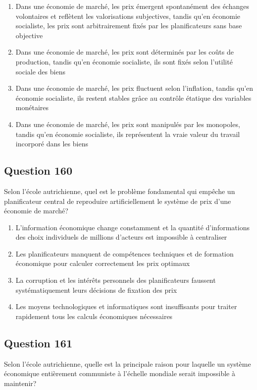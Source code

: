 \documentclass[12pt,a4paper]{article}
\begin{document}
\begin{enumerate}[label=\Alph*., leftmargin=*]
\item Dans une économie de marché, les prix émergent spontanément des échanges volontaires et reflètent les valorisations subjectives, tandis qu'en économie socialiste, les prix sont arbitrairement fixés par les planificateurs sans base objective
\item Dans une économie de marché, les prix sont déterminés par les coûts de production, tandis qu'en économie socialiste, ils sont fixés selon l'utilité sociale des biens
\item Dans une économie de marché, les prix fluctuent selon l'inflation, tandis qu'en économie socialiste, ils restent stables grâce au contrôle étatique des variables monétaires
\item Dans une économie de marché, les prix sont manipulés par les monopoles, tandis qu'en économie socialiste, ils représentent la vraie valeur du travail incorporé dans les biens
\end{enumerate}

\bigskip


\subsection*{Question 160}
Selon l'école autrichienne, quel est le problème fondamental qui empêche un planificateur central de reproduire artificiellement le système de prix d'une économie de marché?

\begin{enumerate}[label=\Alph*., leftmargin=*]
\item L'information économique change constamment et la quantité d'informations des choix individuels de millions d'acteurs est impossible à centraliser
\item Les planificateurs manquent de compétences techniques et de formation économique pour calculer correctement les prix optimaux
\item La corruption et les intérêts personnels des planificateurs faussent systématiquement leurs décisions de fixation des prix
\item Les moyens technologiques et informatiques sont insuffisants pour traiter rapidement tous les calculs économiques nécessaires
\end{enumerate}

\bigskip


\subsection*{Question 161}
Selon l'école autrichienne, quelle est la principale raison pour laquelle un système économique entièrement communiste à l'échelle mondiale serait impossible à maintenir?
\end{document}
